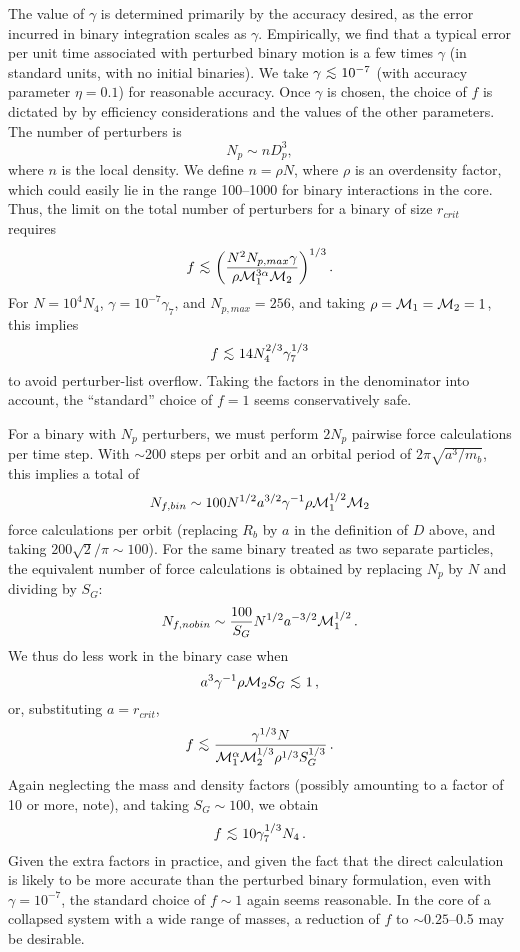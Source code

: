 \documentclass{article}
\newcommand{\simlt}{\ \hbox{\rlap{\raise0.425ex\hbox{$<$}}\lower0.65ex\hbox{$\sim$}}\ }
\begin{document}
The value of $\gamma$ is determined primarily by the accuracy desired,
as the error incurred in binary integration scales as $\gamma$.
Empirically, we find that a typical error per unit time associated
with perturbed binary motion is a few times $\gamma$ (in standard
units, with no initial binaries).  We take $\gamma\simlt 10^{-7}$
(with accuracy parameter $\eta = 0.1$) for reasonable accuracy.  Once
$\gamma$ is chosen, the choice of $f$ is dictated by by efficiency
considerations and the values of the other parameters.  The number of
perturbers is
$$
	N_p \sim n D_p^3,
$$
where $n$ is the local density.  We define $n = \rho N$, where $\rho$
is an overdensity factor, which could easily lie in the range
100--1000 for binary interactions in the core.  Thus, the limit on the
total number of perturbers for a binary of size $r_{crit}$ requires
$$
	f \simlt \biggl(\frac{N^2 N_{p,max} \gamma}
			{\rho {\cal M}_1^{3\alpha} {\cal M}_2}\biggr)^{1/3}\,.
$$
For $N = 10^4N_4$, $\gamma = 10^{-7}\gamma_7$, and $N_{p,max} = 256$,
and taking $\rho = {\cal M}_1 = {\cal M}_2 = 1$, this implies
$$
	f \simlt 14 N_4^{2/3} \gamma_7^{1/3}
$$
to avoid perturber-list overflow.  Taking the factors in the
denominator into account, the ``standard'' choice of $f = 1$ seems
conservatively safe.

For a binary with $N_p$ perturbers, we must perform $2 N_p$ pairwise
force calculations per time step.  With $\sim$200 steps per orbit and
an orbital period of $2\pi\sqrt{a^3/m_b}$, this implies a total of
$$
	N_{f,bin} \sim 100 N^{1/2} a^{3/2} \gamma^{-1}
	 		\rho {\cal M}_1^{1/2} {\cal M}_2
$$
force calculations per orbit (replacing $R_b$ by $a$ in the definition
of $D$ above, and taking $200\sqrt{2}/\pi \sim 100$).  For the same
binary treated as two separate particles, the equivalent number of
force calculations is obtained by replacing $N_p$ by $N$ and dividing
by $S_G$:
$$
	N_{f,nobin} \sim \frac{100}{S_G} N^{1/2} a^{-3/2} {\cal M}_1^{1/2}\,.
$$
We thus do less work in the binary case when
$$
	a^3 \gamma^{-1} \rho {\cal M}_2 S_G \simlt 1\,,
$$
or, substituting $a = r_{crit}$,
$$
	f \simlt \frac{\gamma^{1/3} N}
		      {{\cal M}_1^{\alpha} {\cal M}_2^{1/3}
			\rho^{1/3}S_G^{1/3}}\,.
$$
Again neglecting the mass and density factors (possibly amounting to a
factor of 10 or more, note), and taking $S_G \sim 100$, we obtain
$$
	f \simlt 10 \gamma_7^{1/3} N_4\,.
$$
Given the extra factors in practice, and given the fact that the
direct calculation is likely to be more accurate than the perturbed
binary formulation, even with $\gamma = 10^{-7}$, the standard choice
of $f \sim 1$ again seems reasonable.  In the core of a collapsed
system with a wide range of masses, a reduction of $f$ to $\sim
0.25$--0.5 may be desirable.
\end{document}
